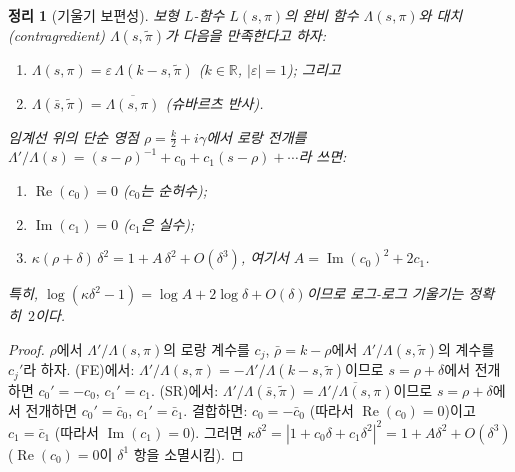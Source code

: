 \documentclass[11pt, a4paper]{article}
\theoremstyle{plain}
\newtheorem{theorem}{정리}
\theoremstyle{definition}
\begin{document}
\begin{theorem}[기울기 보편성]
\label{thm:slopeuniv}
  보형 $L$-함수 $L(s,\pi)$의 완비 함수 $\Lambda(s,\pi)$와
  대치(contragredient) $\Lambda(s,\tilde\pi)$가 다음을 만족한다고 하자:
  \begin{enumerate}
    \item[\textup{(FE)}] $\Lambda(s,\pi) = \varepsilon\,\Lambda(k-s,\tilde\pi)$
          ($k\in\mathbb{R}$, $|\varepsilon|=1$); 그리고
    \item[\textup{(SR)}] $\Lambda(\bar{s},\tilde\pi) = \overline{\Lambda(s,\pi)}$
          \textup{(}슈바르츠 반사\textup{)}.
  \end{enumerate}
  임계선 위의 단순 영점 $\rho=\tfrac{k}{2}+i\gamma$에서
  로랑 전개를
  $\Lambda'/\Lambda(s) = (s-\rho)^{-1} + c_0 + c_1(s-\rho) + \cdots$라 쓰면:
  \begin{enumerate}
    \item[\textup{(i)}] $\operatorname{Re}(c_0)=0$ \textup{(}$c_0$는 순허수\textup{)};
    \item[\textup{(ii)}] $\operatorname{Im}(c_1)=0$ \textup{(}$c_1$은 실수\textup{)};
    \item[\textup{(iii)}] $\kappa(\rho{+}\delta)\,\delta^{2}
          = 1 + A\,\delta^{2} + O(\delta^{3})$,
          여기서 $A = \operatorname{Im}(c_0)^{2} + 2c_1$.
  \end{enumerate}
  특히, $\log(\kappa\delta^{2}-1) = \log A + 2\log\delta + O(\delta)$이므로
  로그-로그 기울기는 정확히~$2$이다.
\end{theorem}

\begin{proof}
  $\rho$에서 $\Lambda'/\Lambda(s,\pi)$의 로랑 계수를 $c_j$,
  $\bar\rho=k-\rho$에서 $\Lambda'/\Lambda(s,\tilde\pi)$의 계수를 $c_j'$라 하자.
  (FE)에서: $\Lambda'/\Lambda(s,\pi)=-\Lambda'/\Lambda(k{-}s,\tilde\pi)$이므로
  $s=\rho+\delta$에서 전개하면 $c_0'=-c_0$, $c_1'=c_1$.
  (SR)에서: $\Lambda'/\Lambda(\bar{s},\tilde\pi)
  =\overline{\Lambda'/\Lambda(s,\pi)}$이므로
  $s=\rho+\delta$에서 전개하면 $c_0'=\bar{c}_0$, $c_1'=\bar{c}_1$.
  결합하면: $c_0=-\bar{c}_0$ (따라서 $\operatorname{Re}(c_0)=0$)이고
  $c_1=\bar{c}_1$ (따라서 $\operatorname{Im}(c_1)=0$).
  그러면 $\kappa\delta^{2}=|1+c_0\delta+c_1\delta^2|^2
  =1+A\delta^2+O(\delta^3)$
  ($\operatorname{Re}(c_0)=0$이 $\delta^1$ 항을 소멸시킴).
\end{proof}
\end{document}
